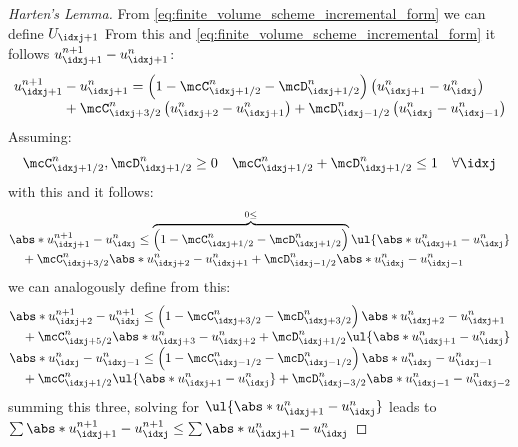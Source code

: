\begin{proofbox}\nospacing
    \begin{proof}[Harten's Lemma]\label{proof:lemma:hartens_lemma}
        From \cref{eq:finite_volume_scheme_incremental_form} we can define $U_{\idxj+1}$
        From this and \cref{eq:finite_volume_scheme_incremental_form} it follows $u_{\idxj+1}^{n+1}-u_{\idxj+1}^{n}$:
        \begin{align*}
          u_{\idxj+1}^{n+1}&-u_{\idxj+1}^{n}=\left(1-\mcC_{\idxj+1/2}^{n}-\mcD_{\idxj+1/2}^{n}\right)\left(u_{\idxj+1}^{n}-u_{\idxj}^{n}\right)\\[-1\jot]
          &+\mcC_{\idxj+3/2}^{n}\left(u_{\idxj+2}^{n}-u_{\idxj+1}^{n}\right)+\mcD_{\idxj-1/2}^{n}\left(u_{\idxj}^{n}-u_{\idxj-1}^{n}\right)
        \end{align*}
        Assuming:
        \begin{align*}
          \mcC_{\idxj+1/2}^{n},\mcD_{\idxj+1/2}^{n}\geq0
          &&\mcC_{\idxj+1/2}^{n}+\mcD_{\idxj+1/2}^{n}\leq1&&\forall\idxj
        \end{align*}
        with this and  it follows:
        \begin{align*}
          &\abs*{u_{\idxj+1}^{n+1}-u_{\idxj}^{n}}\leq
            \overbrace{\left(1-\mcC_{\idxj+1/2}^{n}-\mcD_{\idxj+1/2}^{n}\right)}^{0\leq}\ul{\abs*{u_{\idxj+1}^{n}-u_{\idxj}^{n}}}\\[-1\jot]
          &\quad+\mcC_{\idxj+3/2}^{n}\abs*{u_{\idxj+2}^{n}-u_{\idxj+1}^{n}}+\mcD_{\idxj-1/2}^{n}\abs*{u_{\idxj}^{n}-u_{\idxj-1}^{n}}
        \end{align*}
        we can analogously define from this:
        \begin{align*}
          &\abs*{u_{\idxj+2}^{n+1}-u_{\idxj}^{n+1}}\leq
            \left(1-\mcC_{\idxj+3/2}^{n}-\mcD_{\idxj+3/2}^{n}\right)\abs*{u_{\idxj+2}^{n}-u_{\idxj+1}^{n}}\\[-1\jot]
          &\quad+\mcC_{\idxj+5/2}^{n}\abs*{u_{\idxj+3}^{n}-u_{\idxj+2}^{n}}+\mcD_{\idxj+1/2}^{n}\ul{\abs*{u_{\idxj+1}^{n}-u_{\idxj}^{n}}}\\[-1\jot]
          &\abs*{u_{\idxj}^{n}-u_{\idxj-1}^{n}}\leq
            \left(1-\mcC_{\idxj-1/2}^{n}-\mcD_{\idxj-1/2}^{n}\right)\abs*{u_{\idxj}^{n}-u_{\idxj-1}^{n}}\\[-1\jot]
          &\quad+\mcC_{\idxj+1/2}^{n}\ul{\abs*{u_{\idxj+1}^{n}-u_{\idxj}^{n}}}+\mcD_{\idxj-3/2}^{n}\abs*{u_{\idxj-1}^{n}-u_{\idxj-2}^{n}}
        \end{align*}
        summing this three, solving for $\ul{\abs*{u_{\idxj+1}^{n}-u_{\idxj}^{n}}}$ leads to $\sum\abs*{u_{\idxj+1}^{n+1}-u_{\idxj}^{n+1}}\leq\sum\abs*{u_{\idxj+1}^{n}-u_{\idxj}^{n}}$
    \end{proof}
\end{proofbox}

